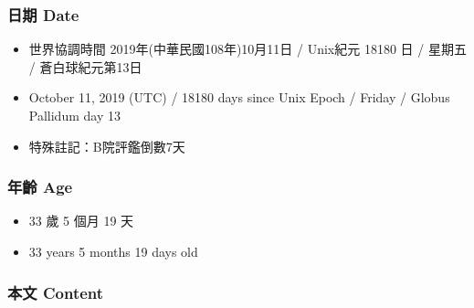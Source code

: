 \documentclass[a5paper, 12pt
]{book}
\providecommand{\tightlist}{%
  \setlength{\itemsep}{0pt}\setlength{\parskip}{0pt}}
\begin{document}
\hypertarget{ux65e5ux671f-date-12}{%
\subsubsection{日期 Date}\label{ux65e5ux671f-date-12}}

\begin{itemize}
\tightlist
\item
  世界協調時間 2019年(中華民國108年)10月11日 / Unix紀元 18180 日 /
  星期五 / 蒼白球紀元第13日
\item
  October 11, 2019 (UTC) / 18180 days since Unix Epoch / Friday / Globus
  Pallidum day 13
\item
  特殊註記：B院評鑑倒數7天
\end{itemize}

\hypertarget{ux5e74ux9f61-age-12}{%
\subsubsection{年齡 Age}\label{ux5e74ux9f61-age-12}}

\begin{itemize}
\tightlist
\item
  33 歲 5 個月 19 天
\item
  33 years 5 months 19 days old
\end{itemize}

\hypertarget{ux672cux6587-content-12}{%
\subsubsection{本文 Content}\label{ux672cux6587-content-12}}
\end{document}
